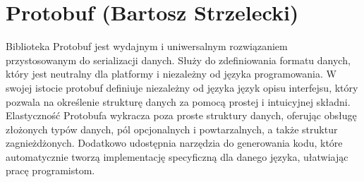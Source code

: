 \section{Protobuf (Bartosz Strzelecki)}

Biblioteka Protobuf jest wydajnym i uniwersalnym rozwiązaniem przystosowanym do serializacji
danych. Służy do zdefiniowania formatu danych, który jest neutralny dla platformy
i niezależny od języka programowania. W swojej istocie protobuf definiuje niezależny od języka język opisu interfejsu,
który pozwala na określenie strukturę danych za pomocą prostej i intuicyjnej składni.
Elastyczność Protobufa wykracza poza proste struktury danych, oferując obsługę złożonych typów danych, pól opcjonalnych i powtarzalnych,
a także struktur zagnieżdżonych. Dodatkowo udostępnia narzędzia do generowania kodu,
które automatycznie tworzą implementację specyficzną dla danego języka, ułatwiając pracę programistom.
